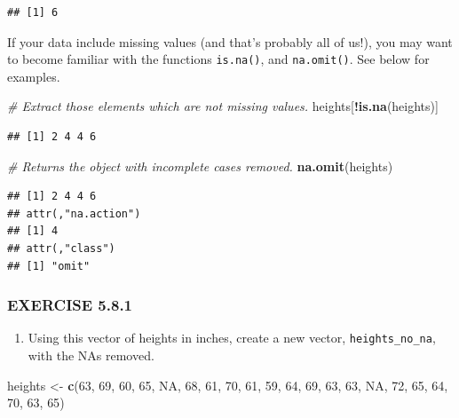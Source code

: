 \documentclass[
]{book}
\newenvironment{Shaded}{\begin{snugshade}}{\end{snugshade}}
\newcommand{\CommentTok}[1]{\textcolor[rgb]{0.56,0.35,0.01}{\textit{#1}}}
\newcommand{\ConstantTok}[1]{\textcolor[rgb]{0.56,0.35,0.01}{#1}}
\newcommand{\DecValTok}[1]{\textcolor[rgb]{0.00,0.00,0.81}{#1}}
\newcommand{\FunctionTok}[1]{\textcolor[rgb]{0.13,0.29,0.53}{\textbf{#1}}}
\newcommand{\NormalTok}[1]{#1}
\newcommand{\OtherTok}[1]{\textcolor[rgb]{0.56,0.35,0.01}{#1}}
\newcommand{\SpecialCharTok}[1]{\textcolor[rgb]{0.81,0.36,0.00}{\textbf{#1}}}
\providecommand{\tightlist}{%
  \setlength{\itemsep}{0pt}\setlength{\parskip}{0pt}}
\begin{document}
\begin{verbatim}
## [1] 6
\end{verbatim}

If your data include missing values (and that's probably all of us!), you may want to become familiar with the functions \texttt{is.na()}, and \texttt{na.omit()}. See below for examples.

\begin{Shaded}
\begin{Highlighting}[]
\CommentTok{\# Extract those elements which are not missing values.}
\NormalTok{heights[}\SpecialCharTok{!}\FunctionTok{is.na}\NormalTok{(heights)]}
\end{Highlighting}
\end{Shaded}

\begin{verbatim}
## [1] 2 4 4 6
\end{verbatim}

\begin{Shaded}
\begin{Highlighting}[]
\CommentTok{\# Returns the object with incomplete cases removed.}
\FunctionTok{na.omit}\NormalTok{(heights)}
\end{Highlighting}
\end{Shaded}

\begin{verbatim}
## [1] 2 4 4 6
## attr(,"na.action")
## [1] 4
## attr(,"class")
## [1] "omit"
\end{verbatim}

\subsubsection*{EXERCISE 5.8.1}\label{exercise-5.8.1}

\begin{enumerate}
\def\labelenumi{\arabic{enumi}.}
\tightlist
\item
  Using this vector of heights in inches, create a new vector, \texttt{heights\_no\_na}, with the NAs removed.
\end{enumerate}

\begin{Shaded}
\begin{Highlighting}[]
\NormalTok{heights }\OtherTok{\textless{}{-}} \FunctionTok{c}\NormalTok{(}\DecValTok{63}\NormalTok{, }\DecValTok{69}\NormalTok{, }\DecValTok{60}\NormalTok{, }\DecValTok{65}\NormalTok{, }\ConstantTok{NA}\NormalTok{, }\DecValTok{68}\NormalTok{, }\DecValTok{61}\NormalTok{, }\DecValTok{70}\NormalTok{, }\DecValTok{61}\NormalTok{, }\DecValTok{59}\NormalTok{, }\DecValTok{64}\NormalTok{, }\DecValTok{69}\NormalTok{, }\DecValTok{63}\NormalTok{, }\DecValTok{63}\NormalTok{, }\ConstantTok{NA}\NormalTok{, }\DecValTok{72}\NormalTok{, }\DecValTok{65}\NormalTok{, }\DecValTok{64}\NormalTok{, }\DecValTok{70}\NormalTok{, }\DecValTok{63}\NormalTok{, }\DecValTok{65}\NormalTok{)}
\end{Highlighting}
\end{Shaded}
\end{document}
